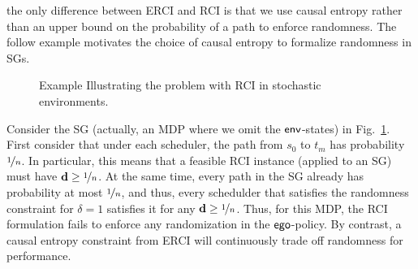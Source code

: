 the only difference between ERCI and RCI is that we use causal entropy
rather than an upper bound on the probability of a path to enforce
randomness.  The follow example motivates the choice of causal entropy
to formalize randomness in SGs.
\begin{figure}
\caption{Example Illustrating the problem with RCI in stochastic environments.\label{fig:drciOnSgs}}
\end{figure}

\begin{example}
  Consider the SG (actually, an MDP where we omit the $\mathsf{env}$-states) in Fig.~\ref{fig:drciOnSgs}.
  First consider that under each scheduler, the path from $s_0$ to
  $t_m$ has probability $\nicefrac{1}{n}$. In particular, this means
  that a feasible RCI instance (applied to an SG) must have
  $\mathbf{d} \geq \nicefrac{1}{n}$. At the same time, every path in
  the SG already has probability at most $\nicefrac{1}{n}$, and thus,
  every schedulder that satisfies the randomness constraint for
  $\delta = 1$ satisfies it for any
  $\mathbf{d} \geq \nicefrac{1}{n}$. Thus, for this MDP, the RCI formulation fails to 
  enforce any randomization in the $\mathsf{ego}$-policy. By contrast, a
  causal entropy constraint from ERCI will continuously trade off randomness
  for performance.
\end{example}

